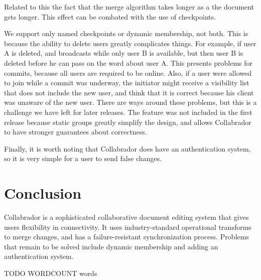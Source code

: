 \documentclass[11pt,titlepage]{article}
\begin{document}
Related to this the fact that the merge algorithm takes longer as a the 
document gets longer. This effect can be combated with the use of checkpoints.

We support only named checkpoints or dynamic membership, not both. This is 
because the ability to delete users greatly complicates things. For example,
if user A is deleted, and broadcasts while only user B is available, but
then user B is deleted before he can pass on the word about user A. This
presents problems for commits, because all users are required to be online. 
Also, if a user were allowed to join while a commit was underway, the 
initiator might receive a visibility list that does not include the new user,
and think that it is correct because his client was unaware of the new user. 
There are ways around these problems, but this is a challenge we have left 
for later releases. The feature was not included in the first release because 
static groups greatly simplify the design, and allows Collabrador to have
stronger guarantees about correctness. 

Finally, it is worth noting that Collabrador does have an authentication system, 
so it is very simple for a user to send false changes. 


\section{Conclusion}

Collabrador is a sophisticated collaborative document editing system that
gives users flexibility in connectivity. It uses industry-standard operational 
transforms to merge changes, and has a failure-resistant synchronization process.
Problems that remain to be solved include dynamic membership and adding an
authentication system. 

 

TODO WORDCOUNT words
\end{document}
